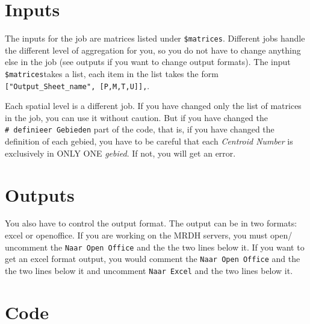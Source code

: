 \documentclass[
  letterpaper,
  DIV=11,
  numbers=noendperiod]{scrreprt}
\begin{document}
\begin{verbatim}
\end{verbatim}

\section{Inputs}

The inputs for the job are matrices listed under \texttt{\$matrices}.
Different jobs handle the different level of aggregation for you, so you
do not have to change anything else in the job (see outputs if you want
to change output formats). The input \texttt{\$matrices}takes a list,
each item in the list takes the form
\texttt{{[}"Output\_Sheet\_name",\ {[}P,M,T,U{]}{]},}.

\begin{tcolorbox}[enhanced jigsaw, bottomtitle=1mm, title=\textcolor{quarto-callout-important-color}{\faExclamation}\hspace{0.5em}{Important}, rightrule=.15mm, toptitle=1mm, colbacktitle=quarto-callout-important-color!10!white, opacitybacktitle=0.6, leftrule=.75mm, opacityback=0, coltitle=black, colframe=quarto-callout-important-color-frame, toprule=.15mm, titlerule=0mm, breakable, bottomrule=.15mm, arc=.35mm, colback=white, left=2mm]

Each spatial level is a different job. If you have changed only the list
of matrices in the job, you can use it without caution. But if you have
changed the \texttt{\#\ definieer\ Gebieden} part of the code, that is,
if you have changed the definition of each gebied, you have to be
careful that each \emph{Centroid Number} is exclusively in ONLY ONE
\emph{gebied}. If not, you will get an error.

\end{tcolorbox}

\section{Outputs}

You also have to control the output format. The output can be in two
formats: excel or openoffice. If you are working on the MRDH servers,
you must open/ uncomment the \texttt{Naar\ Open\ Office} and the the two
lines below it. If you want to get an excel format output, you would
comment the \texttt{Naar\ Open\ Office} and the the two lines below it
and uncomment \texttt{Naar\ Excel} and the two lines below it.

\section{Code}
\end{document}
